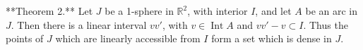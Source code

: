 **Theorem 2.** Let $J$ be a 1-sphere in $\mathbb{R}^2$, with interior $I$, and let $A$ be an arc in $J$. Then there is a linear interval $vv'$, with $v \in \operatorname{Int} A$ and $vv' - v \subset I$. Thus the points of $J$ which are linearly accessible from $I$ form a set which is dense in $J$.
